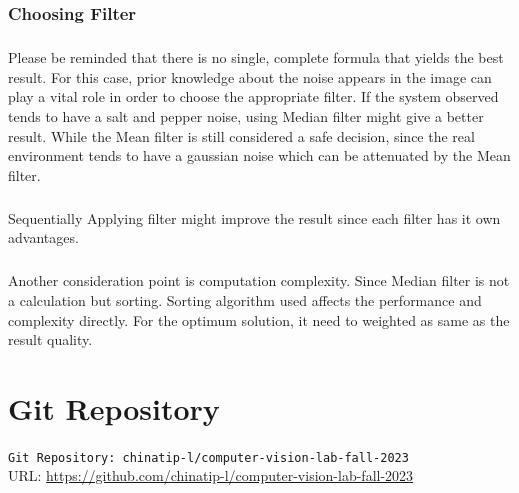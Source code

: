 \documentclass[12pt,a4paper]{report}
\begin{document}
\subsection{Choosing Filter}
\paragraph*{}Please be reminded that there is no single, complete formula that yields the best
result. For this case, prior knowledge about the noise appears in the image can play a vital role in order to choose the appropriate filter. If the system observed tends to have a salt and pepper noise, using Median filter might give a better result. While the Mean filter is still considered a safe decision, since the real environment tends to have a gaussian noise which can be attenuated by the Mean filter.
\paragraph*{}Sequentially Applying filter might improve the result since each filter has it own advantages.

\paragraph*{}Another consideration point is computation complexity. Since Median filter is not a calculation but sorting. Sorting algorithm used affects the performance and complexity directly. For the optimum solution, it need to weighted as same as the result quality.

\appendix
\chapter{Git Repository}

\verb|Git Repository: chinatip-l/computer-vision-lab-fall-2023| \\
URL: \url{https://github.com/chinatip-l/computer-vision-lab-fall-2023}
\end{document}
